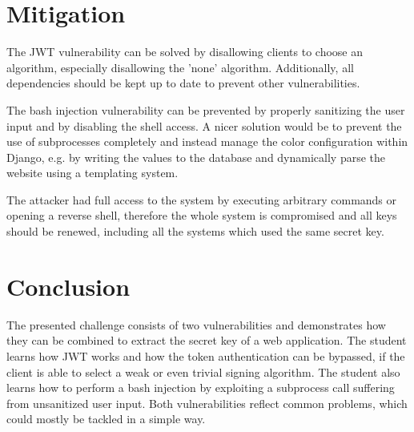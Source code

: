 \documentclass[12pt,a4paper]{article}
\begin{document}
\section{Mitigation}

The JWT vulnerability can be solved by disallowing clients to choose an algorithm, especially disallowing the 'none' algorithm. Additionally, all dependencies should be kept up to date to prevent other vulnerabilities.

The bash injection vulnerability can be prevented by properly sanitizing the user input and by disabling the shell access. A nicer solution would be to prevent the use of subprocesses completely and instead manage the color configuration within Django, e.g. by writing the values to the database and dynamically parse the website using a templating system.

The attacker had full access to the system by executing arbitrary commands or opening a reverse shell, therefore the whole system is compromised and all keys should be renewed, including all the systems which used the same secret key.



\section{Conclusion}
The presented challenge consists of two vulnerabilities and demonstrates how they can be combined to extract the secret key of a web application. The student learns how JWT works and how the token authentication can be bypassed, if the client is able to select a weak or even trivial signing algorithm.
The student also learns how to perform a bash injection by exploiting a subprocess call suffering from unsanitized user input.
Both vulnerabilities reflect common problems, which could mostly be tackled in a simple way.
\end{document}
